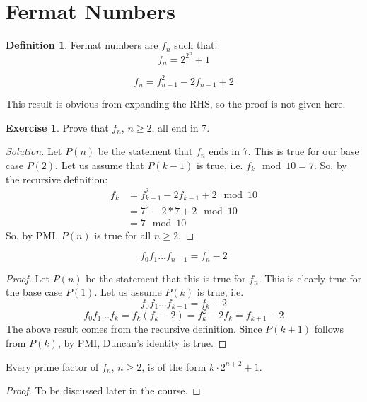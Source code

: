 \documentclass[12pt,letterpaper]{amsbook}
\theoremstyle{definition}
\newtheorem{definition}{Definition} %
\newtheorem*{exercise}{Exercise}
\newenvironment{solution}
  {\renewcommand\qedsymbol{$\blacksquare$}\begin{proof}[Solution]}
  {\end{proof}}
\begin{document}
\section{Fermat Numbers}

\begin{definition}
  Fermat numbers are $f_n$ such that:
  \[f_n = 2^{2^n}+1\]
\end{definition}

\begin{lemma}
  \[f_n = f_{n-1}^2 - 2f_{n-1} + 2\]  
\end{lemma}

This result is obvious from expanding the RHS, so the proof is not given here.

\begin{exercise}
  Prove that $f_n$, $n \geq 2$, all end in 7.
\end{exercise}
\begin{solution}
  Let $P(n)$ be the statement that $f_n$ ends in 7. This is true for our base case $P(2)$. Let us assume that $P(k-1)$ is true, i.e. $f_k \mod 10 = 7$. So, by the recursive definition:
  \begin{align*}
    f_k &= f_{k-1}^2 - 2f_{k-1} + 2 \mod 10 \\
        &= 7^2 - 2* 7 + 2 \mod 10 \\ 
        &= 7 \mod 10
  \end{align*}
  So, by PMI, $P(n)$ is true for all $n \geq 2$.
\end{solution}

\begin{lemma}
  \[f_0f_1...f_{n-1} = f_n - 2\]  
\end{lemma}
\begin{proof}
  Let $P(n)$ be the statement that this is true for $f_n$. This is clearly true for the base case $P(1)$. Let us assume $P(k)$ is true, i.e.
  \[f_0f_1...f_{k-1} = f_k - 2\]
  \[f_0f_1...f_k = f_k(f_k-2) = f_k^2-2f_k = f_{k+1}-2\]
  The above result comes from the recursive definition. Since $P(k+1)$ follows from $P(k)$, by PMI, Duncan's identity is true.
\end{proof}

\begin{theorem}
  Every prime factor of $f_n$, $n \geq 2$, is of the form $k \cdot 2^{n+2} + 1$.
\end{theorem}
\begin{proof}
  To be discussed later in the course.  
\end{proof}
\end{document}
